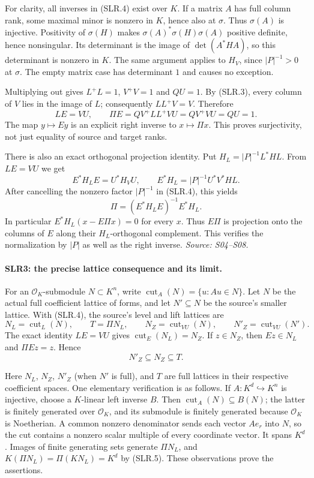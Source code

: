 For clarity, all inverses in (SLR.4) exist over $K$.  If a matrix $A$
has full column rank, some maximal minor is nonzero in $K$, hence also
at $\sigma$.  Thus $\sigma(A)$ is injective.  Positivity of $\sigma(H)$
makes $\sigma(A)^*\sigma(H)\sigma(A)$ positive definite, hence
nonsingular.  Its determinant is the image of
$\det(A^*HA)$, so this determinant is nonzero in $K$.  The same argument
applies to $H_V$, since $|P|^{-1}>0$ at $\sigma$.  The empty matrix
case has determinant $1$ and causes no exception.

Multiplying out gives $L^+L=1$, $V^+V=1$ and $QU=1$.
By (SLR.3), every column of $V$ lies in the image of $L$;
consequently $LL^+V=V$.  Therefore
\[
             LE=VU,\qquad
             \Pi E=QV^+LL^+VU=QV^+VU=QU=1.              \tag{SLR.5}
\]
The map $y\mapsto Ey$ is an explicit right inverse to $x\mapsto\Pi x$.
This proves surjectivity, not just equality of source and target ranks.

There is also an exact orthogonal projection identity.  Put
$H_L=|P|^{-1}L^*HL$.  From $LE=VU$ we get
\[
 E^*H_LE=U^*H_VU,
 \qquad
 E^*H_L=|P|^{-1}U^*V^*HL.
\]
After cancelling the nonzero factor $|P|^{-1}$ in (SLR.4), this yields
\[
             \Pi=(E^*H_LE)^{-1}E^*H_L.                  \tag{SLR.6}
\]
In particular $E^*H_L(x-E\Pi x)=0$ for every $x$.  Thus $E\Pi$ is
projection onto the columns of $E$ along their $H_L$-orthogonal
complement.  This verifies the normalization by $|P|$ as well as the
right inverse.
\emph{Source: S04--S08.}

\paragraph{SLR3: the precise lattice consequence and its limit.}
\label{claim:SLR3}
For an $\mathcal O_K$-submodule $N\subset K^n$, write
$\operatorname{cut}_A(N)=\{u:Au\in N\}$.  Let $N$ be the actual
full coefficient lattice of forms, and let $N'\subseteq N$ be the
source's smaller lattice.  With (SLR.4), the source's level and lift
lattices are
\[
 N_L=\operatorname{cut}_L(N),\qquad
 T=\Pi N_L,\qquad
 N_Z=\operatorname{cut}_{VU}(N),\qquad
 N'_Z=\operatorname{cut}_{VU}(N').                       \tag{SLR.7}
\]
The exact identity $LE=VU$ gives
$\operatorname{cut}_E(N_L)=N_Z$.  If $z\in N_Z$, then $Ez\in N_L$
and $\Pi Ez=z$.  Hence
\[
                         N'_Z\subseteq N_Z\subseteq T.   \tag{SLR.8}
\]

Here $N_L$, $N_Z$, $N'_Z$ (when $N'$ is full), and $T$ are full
lattices in their respective coefficient spaces.  One elementary
verification is as follows.  If $A:K^d\hookrightarrow K^n$ is
injective, choose a $K$-linear left inverse $B$.  Then
$\operatorname{cut}_A(N)\subseteq B(N)$; the latter is finitely
generated over $\mathcal O_K$, and its submodule is finitely generated
because $\mathcal O_K$ is Noetherian.  A common nonzero denominator
sends each vector $Ae_r$ into $N$, so the cut contains a nonzero scalar
multiple of every coordinate vector.  It spans $K^d$.
Images of finite generating sets generate $\Pi N_L$, and
$K(\Pi N_L)=\Pi(KN_L)=K^d$ by (SLR.5).  These observations prove the
assertions.

